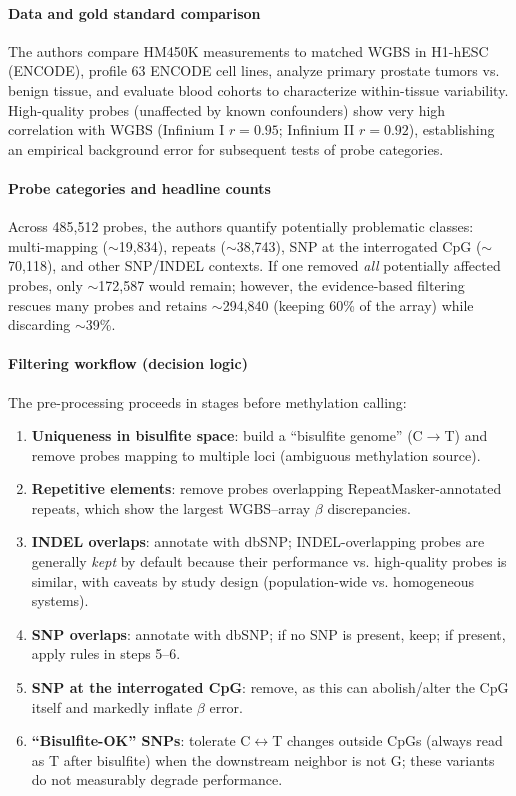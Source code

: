 \documentclass[10pt]{extarticle}
\begin{document}
\paragraph{Data and gold standard comparison}
The authors compare HM450K measurements to matched WGBS in H1-hESC (ENCODE), profile 63 ENCODE cell lines, analyze primary prostate tumors vs. benign tissue, and evaluate blood cohorts to characterize within-tissue variability. High-quality probes (unaffected by known confounders) show very high correlation with WGBS (Infinium I \(r{=}0.95\); Infinium II \(r{=}0.92\)), establishing an empirical background error for subsequent tests of probe categories. 

\paragraph{Probe categories and headline counts}
Across 485{,}512 probes, the authors quantify potentially problematic classes: multi-mapping (\(\sim\)19{,}834), repeats (\(\sim\)38{,}743), SNP at the interrogated CpG (\(\sim\)70{,}118), and other SNP/INDEL contexts. If one removed \emph{all} potentially affected probes, only \(\sim\)172{,}587 would remain; however, the evidence-based filtering rescues many probes and retains \(\sim\)294{,}840 (keeping 60\% of the array) while discarding \(\sim\)39\%.

\paragraph{Filtering workflow (decision logic)}
The pre-processing proceeds in stages before methylation calling:
\begin{enumerate}
  \item \textbf{Uniqueness in bisulfite space}: build a “bisulfite genome” (C\(\to\)T) and remove probes mapping to multiple loci (ambiguous methylation source). 
  \item \textbf{Repetitive elements}: remove probes overlapping RepeatMasker-annotated repeats, which show the largest WGBS–array \(\beta\) discrepancies. 
  \item \textbf{INDEL overlaps}: annotate with dbSNP; INDEL-overlapping probes are generally \emph{kept} by default because their performance vs. high-quality probes is similar, with caveats by study design (population-wide vs. homogeneous systems). 
  \item \textbf{SNP overlaps}: annotate with dbSNP; if no SNP is present, keep; if present, apply rules in steps 5–6. 
  \item \textbf{SNP at the interrogated CpG}: remove, as this can abolish/alter the CpG itself and markedly inflate \(\beta\) error. 
  \item \textbf{“Bisulfite-OK” SNPs}: tolerate C\(\leftrightarrow\)T changes outside CpGs (always read as T after bisulfite) when the downstream neighbor is not G; these variants do not measurably degrade performance. 
\end{enumerate}
\end{document}
